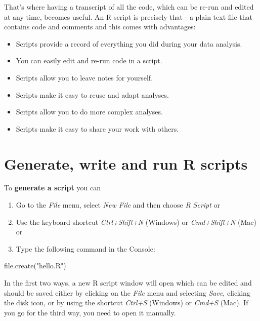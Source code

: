 \documentclass[
  12pt,
  oneside]{book}
\newenvironment{Shaded}{\begin{snugshade}}{\end{snugshade}}
\newcommand{\FunctionTok}[1]{\textcolor[rgb]{0.00,0.00,0.00}{#1}}
\newcommand{\NormalTok}[1]{#1}
\newcommand{\StringTok}[1]{\textcolor[rgb]{0.31,0.60,0.02}{#1}}
\providecommand{\tightlist}{%
  \setlength{\itemsep}{0pt}\setlength{\parskip}{0pt}}
\begin{document}
That's where having a transcript of all the code, which can be re-run and edited at any time, becomes useful. An R script is precisely that - a plain text file that contains code and comments and this comes with advantages:

\begin{itemize}
\tightlist
\item
  Scripts provide a record of everything you did during your data analysis.
\item
  You can easily edit and re-run code in a script.
\item
  Scripts allow you to leave notes for yourself.
\item
  Scripts make it easy to reuse and adapt analyses.
\item
  Scripts allow you to do more complex analyses.
\item
  Scripts make it easy to share your work with others.
\end{itemize}

\hypertarget{generate-write-and-run-r-scripts}{%
\section{Generate, write and run R scripts}\label{generate-write-and-run-r-scripts}}

To \textbf{generate a script} you can

\begin{enumerate}
\def\labelenumi{\arabic{enumi}.}
\tightlist
\item
  Go to the \emph{File} menu, select \emph{New File} and then choose \emph{R Script} or
\item
  Use the keyboard shortcut \emph{Ctrl+Shift+N} (Windows) or \emph{Cmd+Shift+N} (Mac) or
\item
  Type the following command in the Console:
\end{enumerate}

\begin{Shaded}
\begin{Highlighting}[]
\FunctionTok{file.create}\NormalTok{(}\StringTok{"hello.R"}\NormalTok{)}
\end{Highlighting}
\end{Shaded}

In the first two ways, a new R script window will open which can be edited and should be saved either by clicking on the \emph{File} menu and selecting \emph{Save}, clicking the disk icon, or by using the shortcut \emph{Ctrl+S} (Windows) or \emph{Cmd+S} (Mac).
If you go for the third way, you need to open it manually.
\end{document}
